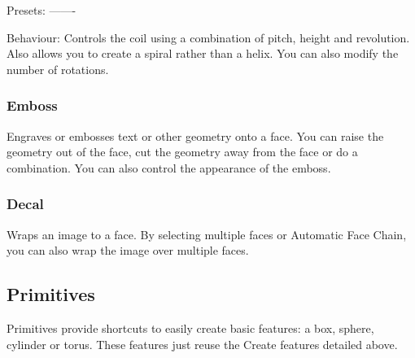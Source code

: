 Presets:
-------

Behaviour:
Controls the coil using a combination of pitch, height and revolution. Also allows you to create a spiral rather than a helix. You can also modify the number of rotations.

\subsubsection{Emboss}
Engraves or embosses text or other geometry onto a face. You can raise the geometry out of the face, cut the geometry away from the face or do a combination. You can also control the appearance of the emboss.

\subsubsection{Decal}
Wraps an image to a face. By selecting multiple faces or Automatic Face Chain, you can also wrap the image over multiple faces.



\subsection{Primitives}
Primitives provide shortcuts to easily create basic features: a box, sphere, cylinder or torus. These features just reuse the Create features detailed above.